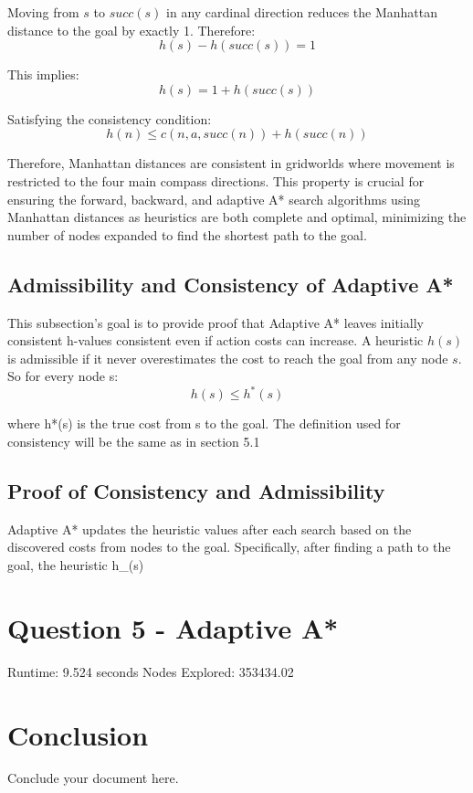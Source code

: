 \documentclass{article}
\begin{document}
Moving from \(s\) to \(succ(s)\) in any cardinal direction reduces the Manhattan distance to the goal by exactly 1. Therefore:
\[h(s) - h(succ(s)) = 1\]

This implies:
\[h(s) = 1 + h(succ(s))\]

Satisfying the consistency condition:
\[h(n) \leq c(n, a, succ(n)) + h(succ(n))\]

Therefore, Manhattan distances are consistent in gridworlds where movement is restricted to the four main compass directions. This property is crucial for ensuring the forward, backward, and adaptive A* search algorithms using Manhattan distances as heuristics are both complete and optimal, minimizing the number of nodes expanded to find the shortest path to the goal.

\subsection{Admissibility and Consistency of Adaptive A*}
This subsection's goal is to provide proof that  Adaptive A* leaves initially consistent h-values consistent even if action costs can increase.  A heuristic \(h(s)\) is admissible if it never overestimates the cost to reach the goal from any node \(s\). So for every node s: \[h(s) \leq h^*(s)\]

where h*(s) is the true cost from s to the goal. The definition used for consistency will be the same as in section 5.1

\subsection{Proof of Consistency and Admissibility}
Adaptive A* updates the heuristic values after each search based on the discovered costs from nodes to the goal. Specifically, after finding a path to the goal, the heuristic h\_{}(s)





\section{Question 5 - Adaptive A*}
Runtime: 9.524 seconds
Nodes Explored: 353434.02

\section{Conclusion}
Conclude your document here.
\end{document}
